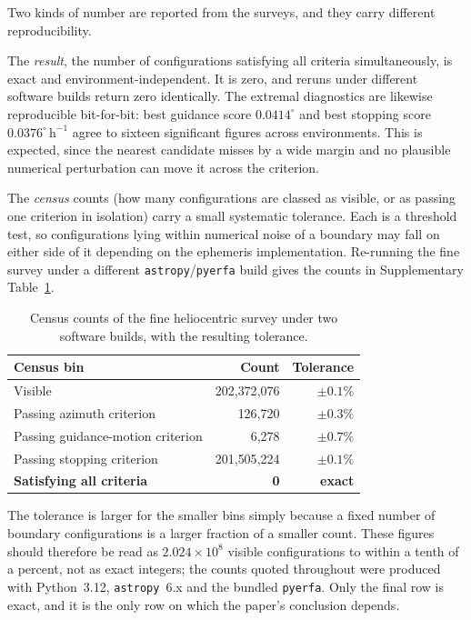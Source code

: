 \documentclass[11pt,a4paper]{article}
\begin{document}
Two kinds of number are reported from the surveys, and they carry different
reproducibility.

The \emph{result}, the number of configurations satisfying all criteria
simultaneously, is exact and environment-independent.  It is zero, and reruns
under different software builds return zero identically.  The extremal
diagnostics are likewise reproducible bit-for-bit: best guidance score
$0.0414^\circ$ and best stopping score $0.0376^\circ\,\mathrm{h}^{-1}$ agree to
sixteen significant figures across environments.  This is expected, since the
nearest candidate misses by a wide margin and no plausible numerical
perturbation can move it across the criterion.

The \emph{census} counts (how many configurations are classed as visible, or
as passing one criterion in isolation) carry a small systematic tolerance.
Each is a threshold test, so configurations lying within numerical noise of a
boundary may fall on either side of it depending on the ephemeris
implementation.  Re-running the fine survey under a different
\texttt{astropy}/\texttt{pyerfa} build gives the counts in Supplementary Table~\ref{tab:buildtol}.

\begin{table}[htbp]
\centering
\caption{Census counts of the fine heliocentric survey under two software builds, with the resulting tolerance.}\label{tab:buildtol}
\small
\begin{tabular}{@{}lrr@{}}
\toprule
Census bin & Count & Tolerance \\
\midrule
Visible                       & 202{,}372{,}076 & $\pm 0.1\%$ \\
Passing azimuth criterion     &     126{,}720   & $\pm 0.3\%$ \\
Passing guidance-motion criterion &   6{,}278   & $\pm 0.7\%$ \\
Passing stopping criterion    & 201{,}505{,}224 & $\pm 0.1\%$ \\
\midrule
\textbf{Satisfying all criteria} & \textbf{0} & \textbf{exact} \\
\bottomrule
\end{tabular}
\end{table}

The tolerance is larger for the smaller bins simply because a fixed number of
boundary configurations is a larger fraction of a smaller count.  These figures
should therefore be read as $2.024\times10^{8}$ visible configurations to within
a tenth of a percent, not as exact integers; the counts quoted throughout were
produced with Python~3.12, \texttt{astropy}~6.x and the bundled
\texttt{pyerfa}.  Only the final row is exact, and it is the only row on which
the paper's conclusion depends.
\end{document}
